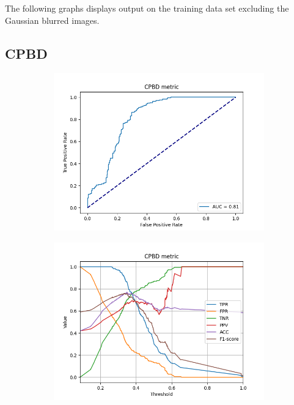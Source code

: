 The following graphs displays output on the training data set excluding the Gaussian blurred images.



\subsection{CPBD}
\begin{figure}[H]
    \centering
    \begin{subfigure}[t]{0.48\textwidth}
        \includegraphics[width=\textwidth]{Figures/results_on_thresholds/output_roc_cpbd.png}
        \caption{}
        \label{fig:CPBD_roc}
    \end{subfigure}\hspace{1em}
    \begin{subfigure}[t]{0.48\textwidth}
        \includegraphics[width=\textwidth]{Figures/results_on_thresholds/threshold_test_scores_cpbd.png}

\end{subfigure}
\end{figure}
